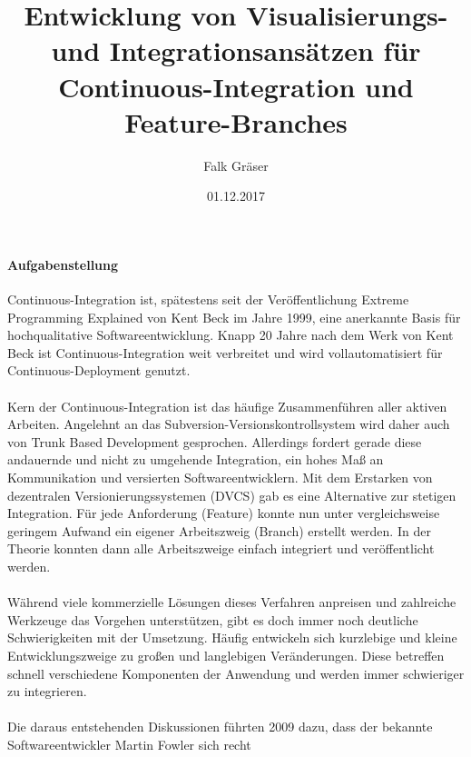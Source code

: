 \documentclass[11pt,english,german]{article}
\begin{document}
\sffamily

\title{\vspace{-2.0cm}\textbf{Entwicklung von Visualisierungs- und Integrationsansätzen für Continuous-Integration und Feature-Branches}}
\author{Falk Gräser}
\date{01.12.2017}

\maketitle
{}

\paragraph{\textsf{Aufgabenstellung}}
Continuous-Integration ist, spätestens seit der Veröffentlichung \glqq Extreme Programming Explained\grqq{}  von Kent Beck im Jahre 1999,
eine anerkannte Basis für hochqualitative Softwareentwicklung. Knapp 20 Jahre nach dem Werk von Kent Beck ist Continuous-Integration weit
verbreitet und wird vollautomatisiert für Continuous-Deployment genutzt.
\\
\\
Kern der Continuous-Integration ist das häufige Zusammenführen aller aktiven Arbeiten. Angelehnt an das \glqq Subversion\grqq{}-Versionskontrollsystem
wird daher auch von \glqq Trunk Based Development\grqq{} gesprochen.
Allerdings fordert gerade diese andauernde und nicht zu umgehende Integration, ein hohes Maß an Kommunikation und versierten Softwareentwicklern.
Mit dem Erstarken von dezentralen Versionierungssystemen (DVCS) gab es eine Alternative zur stetigen Integration. Für jede Anforderung (Feature)
konnte nun unter vergleichsweise geringem Aufwand ein eigener Arbeitszweig (Branch) erstellt werden. In der Theorie konnten
dann alle Arbeitszweige \glqq einfach\grqq{} integriert und veröffentlicht werden.
\\
\\
Während viele kommerzielle Lösungen dieses Verfahren anpreisen und zahlreiche Werkzeuge das Vorgehen unterstützen, gibt
es doch immer noch deutliche Schwierigkeiten mit der Umsetzung. Häufig entwickeln sich \glqq kurzlebige und kleine\grqq{}
Entwicklungszweige zu \glqq großen und langlebigen\grqq{} Veränderungen. Diese betreffen schnell verschiedene Komponenten
der Anwendung und werden immer schwieriger zu integrieren.
\\
\\
Die daraus entstehenden Diskussionen führten 2009 dazu, dass der bekannte Softwareentwickler Martin Fowler sich recht
\end{document}
